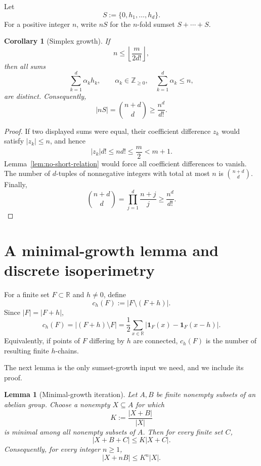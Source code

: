 \documentclass[11pt]{article}
\newtheorem{lemma}[theorem]{Lemma}
\newtheorem{corollary}[theorem]{Corollary}
\theoremstyle{definition}
\newcommand{\R}{\mathbb{R}}
\newcommand{\Z}{\mathbb{Z}}
\newcommand{\1}{\mathbf{1}}
\begin{document}
Let
\begin{equation}\label{eq:S}
  S:=\{0,h_1,\ldots,h_d\}.
\end{equation}
For a positive integer $n$, write $nS$ for the $n$-fold sumset $S+\cdots+S$.

\begin{corollary}[Simplex growth]\label{cor:simplex-growth}
If
\begin{equation}\label{eq:n-range}
  n\le\left\lfloor\frac{m}{2d!}\right\rfloor,
\end{equation}
then all sums
\[
  \sum_{k=1}^d \alpha_kh_k,
  \qquad
  \alpha_k\in\Z_{\ge0},\quad
  \sum_{k=1}^d\alpha_k\le n,
\]
are distinct.  Consequently,
\begin{equation}\label{eq:nS-count}
  |nS|=\binom{n+d}{d}\ge\frac{n^d}{d!}.
\end{equation}
\end{corollary}

\begin{proof}
If two displayed sums were equal, their coefficient difference $z_k$ would satisfy $|z_k|\le n$, and hence
\[
  |z_k|d!\le nd!\le\frac m2<m+1.
\]
Lemma~\ref{lem:no-short-relation} would force all coefficient differences to vanish.  The number of $d$-tuples of nonnegative integers with total at most $n$ is $\binom{n+d}{d}$.  Finally,
\[
  \binom{n+d}{d}=\prod_{j=1}^d\frac{n+j}{j}\ge\frac{n^d}{d!}.
\]
\end{proof}

\section{A minimal-growth lemma and discrete isoperimetry}

For a finite set $F\subset\R$ and $h\ne0$, define
\begin{equation}\label{eq:ch}
  c_h(F):=|F\setminus(F+h)|.
\end{equation}
Since $|F|=|F+h|$,
\begin{equation}\label{eq:ch-other}
  c_h(F)=|(F+h)\setminus F|
  =\frac12\sum_{x\in\R}|\1_F(x)-\1_F(x-h)|.
\end{equation}
Equivalently, if points of $F$ differing by $h$ are connected, $c_h(F)$ is the number of resulting finite $h$-chains.

The next lemma is the only sumset-growth input we need, and we include its proof.

\begin{lemma}[Minimal-growth iteration]\label{lem:minimal-growth}
Let $A,B$ be finite nonempty subsets of an abelian group.  Choose a nonempty $X\subseteq A$ for which
\[
  K:=\frac{|X+B|}{|X|}
\]
is minimal among all nonempty subsets of $A$.  Then for every finite set $C$,
\begin{equation}\label{eq:minimal-growth-one}
  |X+B+C|\le K|X+C|.
\end{equation}
Consequently, for every integer $n\ge1$,
\begin{equation}\label{eq:minimal-growth-iterate}
  |X+nB|\le K^n|X|.
\end{equation}
\end{lemma}
\end{document}
